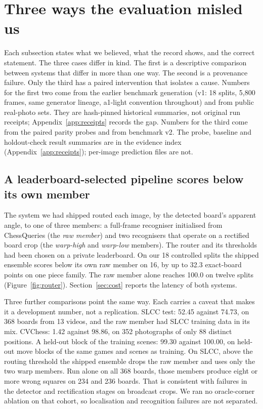 \section{Three ways the evaluation misled us}
\label{sec:lies}

Each subsection states what we believed, what the record shows, and the correct statement. The
three cases differ in kind. The first is a descriptive comparison between systems that differ in
more than one way. The second is a provenance failure. Only the third has a paired intervention
that isolates a cause. Numbers for the first two come from the earlier benchmark generation (v1:
18 splits, 5{,}800 frames, same generator lineage, a1-light convention throughout) and from public
real-photo sets. They are hash-pinned historical summaries, not original run receipts; Appendix~\ref{app:receipts}
records the gap. Numbers for the third come from the paired parity probes and from benchmark v2.
The probe, baseline and holdout-check result summaries are in the evidence index (Appendix~\ref{app:receipts}); per-image prediction files are not.

\subsection{A leaderboard-selected pipeline scores below its own member}
\label{sec:router}

The system we had shipped routed each image, by the detected board's apparent angle, to one of
three members: a full-frame recogniser initialised from ChessQueries (the \emph{raw member}) and
two recognisers that operate on a rectified board crop (the \emph{warp-high} and \emph{warp-low}
members). The router and its thresholds had been chosen on a private leaderboard. On our 18
controlled splits the shipped ensemble scores below its own raw member on 16, by up to 32.3
exact-board points on one piece family. The raw member alone reaches 100.0 on twelve splits
(Figure~\ref{fig:router}). Section~\ref{sec:cost} reports the latency of both systems.

Three further comparisons point the same way. Each carries a caveat that makes it a development
number, not a replication. SLCC test: 52.45 against 74.73, on 368 boards from 13 videos, and the
raw member had SLCC training data in its mix. CVChess: 1.42 against 98.86, on 352 photographs of
only 88 distinct positions. A held-out block of the training scenes: 99.30 against 100.00, on
held-out move blocks of the same games and scenes as training. On SLCC, above the routing
threshold the shipped ensemble drops the raw member and uses only the two warp members. Run alone
on all 368 boards, those members produce eight or more wrong squares on 234 and 236 boards. That
is consistent with failures in the detector and rectification stages on broadcast crops. We ran no
oracle-corner ablation on that cohort, so localisation and recognition failures are not separated.

